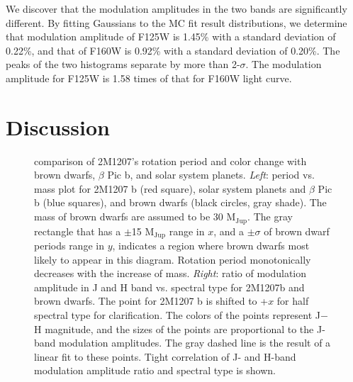 \documentclass[apj]{emulateapj}
\newcommand{\bpic}{$\beta$ Pic}
\newcommand{\vsini}{$v\sin i$}
\newcommand{\mjup}{M$_{\mbox{Jup}}$}
\begin{document}
We discover that the modulation amplitudes in the two bands are significantly
different. By fitting Gaussians to the MC fit result distributions, we
determine that modulation amplitude of F125W is 1.45\% with a
standard deviation of 0.22\%, and that of F160W is 0.92\% with a
standard deviation of 0.20\%. The peaks of the two
histograms separate by more than 2-$\sigma$. The modulation amplitude
for F125W is 1.58 times of that for F160W light curve.


\section{Discussion}

\begin{figure}
  \centering
  \caption{comparison of 2M1207's rotation period and color change
    with brown dwarfs, \bpic{} b, and solar system planets. {\em
      Left}: period vs. mass plot for 2M1207 b (red square), solar
    system planets and \bpic{} b (blue squares), and brown dwarfs
    (black circles, gray shade). The mass of brown dwarfs are assumed
    to be 30 \mjup{}. The gray rectangle that has a $\pm$15 \mjup
    range in $x$, and a $\pm \sigma$ of brown dwarf periods range in
    $y$, indicates a region where brown dwarfs most likely to appear
    in this diagram. Rotation period monotonically decreases with the
    increase of mass. {\em Right}: ratio of modulation amplitude in J
    and H band vs. spectral type for 2M1207b and brown dwarfs. The
    point for 2M1207 b is shifted to +$x$ for half spectral type for
    clarification.  The colors of the points represent J$-$H
    magnitude, and the sizes of the points are proportional to the
    J-band modulation amplitudes. The gray dashed line is the result
    of a linear fit to these points. Tight correlation of J- and
    H-band modulation amplitude ratio and spectral type is shown.}
 \label{fig:5}
\end{figure}

\end{document}
